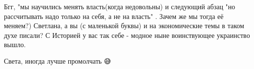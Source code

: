 \begin{itemize}
 
Бгг, "мы научились менять власть(когда недовольны) и следующий абзац "но рассчитывать надо только на себя, а не на власть" . Зачем же мы тогда её меняем?) Светлана, а вы (с маленькой буквы) и на экономические темы в таком духе писали? С Историей у вас так себе - модное ныне воинствующее украинство вышло.

 
Света, иногда лучше промолчать 😅

\end{itemize}

